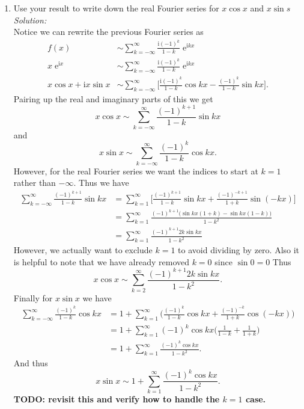 \documentclass[10pt]{amsart}
\newcommand{\I}{\mathrm{i}}
\DeclareMathOperator{\E}{e}
\theoremstyle{nonumberplain}
\begin{document}
\begin{enumerate}[label={\bf {\arabic*}:}]
\begin{enumerate}
\item Use your result to write down the real Fourier series for $x\cos x$ and $x \sin s$ \\
\noindent
\textit{Solution:} \\
Notice we can rewrite the previous Fourier series as
\begin{align*}
f(x) &\sim \sum_{k=-\infty}^{\infty} \frac {\I (-1)^{k} } {1 - k} \E^{\I k x} \\
x \E^{\I x} &\sim \sum_{k=-\infty}^{\infty} \frac {\I (-1)^{k} } {1 - k} \E^{\I k x} \\
x \cos x + \I x\sin x &\sim \sum_{k=-\infty}^{\infty} \Bigg[ \frac {\I (-1)^{k} } {1 - k} \cos kx - \frac { (-1)^{k} } {1 - k}\sin kx \Bigg].
\end{align*}
Pairing up the real and imaginary parts of this we get
$$
x \cos x \sim \sum_{k=-\infty}^{\infty}  \frac { (-1)^{k + 1} } {1 - k}\sin kx
$$
and
$$
x \sin x \sim \sum_{k=-\infty}^{\infty} \frac {(-1)^{k} } {1 - k} \cos kx.
$$
However, for the real Fourier series we want the indices to start at $k=1$ rather than $-\infty$.
Thus we have
\begin{align*}
\sum_{k=-\infty}^{\infty}  \frac { (-1)^{k + 1} } {1 - k}\sin kx
	&= \sum_{k=1}^{\infty}  \Bigg[ \frac { (-1)^{k + 1} } {1 - k}\sin kx + \frac { (-1)^{-k + 1} } {1 + k}\sin (-kx) \Bigg] \\
	&= \sum_{k=1}^{\infty}  \frac { (-1)^{k + 1} \Big( \sin kx (1 + k) - \sin kx (1 - k) \Big)} {1 - k^2} \\
	&= \sum_{k=1}^{\infty}  \frac { (-1)^{k + 1} 2 k \sin kx} {1 - k^2}
\end{align*}
However, we actually want to exclude $k= 1$ to avoid dividing by zero.
Also it is helpful to note that we have already removed $k = 0$ since $\sin 0 = 0$
Thus
$$
x \cos x \sim \sum_{k=2}^{\infty}  \frac { (-1)^{k + 1} 2 k \sin kx} {1 - k^2}.
$$
Finally for $x \sin x$ we have
\begin{align*}
\sum_{k=-\infty}^{\infty} \frac {(-1)^{k} } {1 - k} \cos kx
	&= 1 + \sum_{k=1}^{\infty} \Bigg( \frac {(-1)^{k} } {1 - k} \cos kx + \frac {(-1)^{-k} } {1 + k} \cos (- kx) \Bigg) \\
	&= 1 + \sum_{k=1}^{\infty} (-1)^{k} \cos kx \Bigg( \frac {1} {1 - k}  + \frac { 1 } {1 + k} \Bigg) \\
	&= 1 + \sum_{k=1}^{\infty} \frac {(-1)^{k} \cos kx } {1 - k^2}.
\end{align*}
And thus
$$
x \sin x \sim 1 + \sum_{k=1}^{\infty} \frac {(-1)^{k} \cos kx } {1 - k^2}.
$$
\textbf{TODO: revisit this and verify how to handle the $k=1$ case.}



\end{enumerate}
\end{enumerate}
\end{document}
